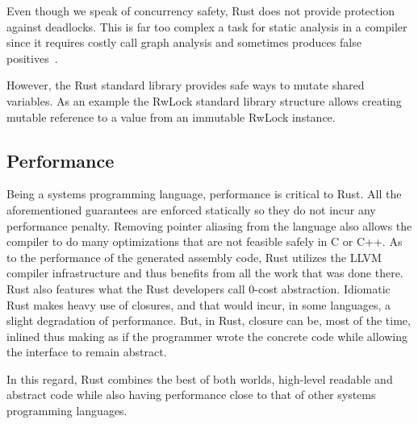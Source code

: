 Even though we speak of concurrency safety, Rust does not provide
protection against deadlocks. This is far too complex a task for
static analysis in a compiler since it requires costly call graph
analysis and sometimes produces false
positives~\cite{deadlock-detection}.

However, the Rust standard library provides safe ways to mutate shared
variables. As an example the RwLock standard library structure allows
creating mutable reference to a value from an immutable RwLock instance.

\subsection{Performance}

Being a systems programming language, performance is critical to
Rust. All the aforementioned guarantees are enforced statically so
they do not incur any performance penalty. Removing pointer aliasing
from the language also allows the compiler to do many optimizations
that are not feasible safely in C or C++. As to the performance of the
generated assembly code, Rust utilizes the LLVM compiler
infrastructure and thus benefits from all the work that was done
there. Rust also features what the Rust developers call 0-cost
abstraction. Idiomatic Rust makes heavy use of closures, and that
would incur, in some languages, a slight degradation of
performance. But, in Rust, closure can be, most of the time, inlined
thus making as if the programmer wrote the concrete code while
allowing the interface to remain abstract.

In this regard, Rust combines the best of both worlds, high-level
readable and abstract code while also having performance close to that
of other systems programming languages.

